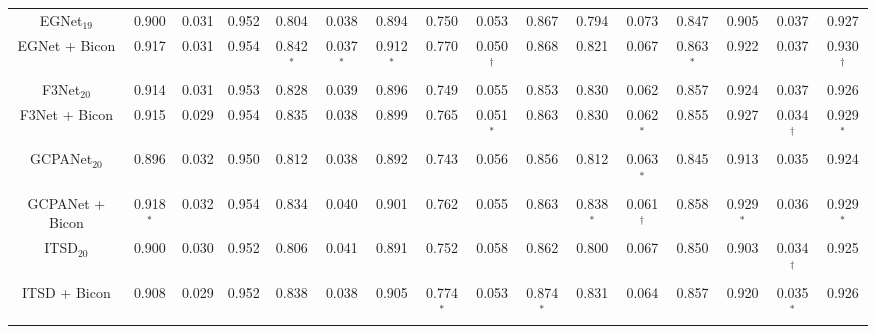 \documentclass[review]{cvpr}
\begin{document}
\begin{table*}[h!]
{{\begin{tabular}{c ccc ccc ccc ccc ccc}
\cline{1-16}
{EGNet$_{19}$ \cite{egnet}}&0.900&0.031&0.952&0.804&0.038&0.894&0.750&0.053&0.867&0.794&0.073&0.847&0.905&0.037&0.927\\
{EGNet + Bicon}&\color{BrickRed}0.917&0.031&\color{BrickRed}0.954&\color{BrickRed}0.842\color{blue}$^\ast$&\color{BrickRed}0.037\color{blue}$^\ast$&\color{BrickRed}0.912\color{blue}$^\ast$&\color{BrickRed}0.770&\color{BrickRed}0.050\color{blue}$^\dagger$&\color{BrickRed}0.868&\color{BrickRed}0.821&\color{BrickRed}0.067&\color{BrickRed}0.863\color{blue}$^\ast$\color{BrickRed}&\color{BrickRed}0.922&0.037&\color{BrickRed}0.930\color{blue}$^\dagger$\\

\cline{1-16}
{F3Net$_{20}$ \cite{f3net}}&0.914&0.031&0.953&0.828&0.039&0.896&0.749&0.055&0.853&0.830&0.062&\color{BrickRed}0.857&0.924&0.037&0.926\\


{F3Net + Bicon}&\color{BrickRed}0.915&\color{BrickRed}0.029&\color{BrickRed}0.954&\color{BrickRed}0.835&\color{BrickRed}0.038&\color{BrickRed}0.899&\color{BrickRed}0.765&\color{BrickRed}0.051\color{blue}$^\ast$&\color{BrickRed}0.863&0.830&0.062\color{blue}$^\ast$&0.855&\color{BrickRed}0.927&\color{BrickRed}0.034\color{blue}$^\dagger$&\color{BrickRed}0.929\color{blue}$^\ast$\\



\cline{1-16}
{GCPANet$_{20}$ \cite{gcpa}}&0.896&0.032&0.950&0.812&\color{BrickRed}0.038&0.892&0.743&0.056&0.856&0.812&0.063\color{blue}$^\ast$&0.845&0.913&\color{BrickRed}0.035&0.924\\


{GCPANet + Bicon}&\color{BrickRed}0.918\color{blue}$^\ast$&0.032&\color{BrickRed}0.954&\color{BrickRed}0.834&0.040&\color{BrickRed}0.901&\color{BrickRed}0.762&\color{BrickRed}0.055&\color{BrickRed}0.863&\color{BrickRed}0.838\color{blue}$^\ast$&\color{BrickRed}0.061\color{blue}$^\dagger$&\color{BrickRed}0.858&\color{BrickRed}0.929\color{blue}$^\ast$&0.036&\color{BrickRed}0.929\color{blue}$^\ast$\\


\cline{1-16}
{ITSD$_{20}$ \cite{ITSD}}&0.900&0.030&0.952&0.806&0.041&0.891&0.752&0.058&0.862&0.800&0.067&0.850&0.903&\color{BrickRed}0.034\color{blue}$^\dagger$&0.925\\


{ITSD + Bicon}&\color{BrickRed}0.908&\color{BrickRed}0.029&0.952&\color{BrickRed}0.838&\color{BrickRed}0.038&\color{BrickRed}0.905&\color{BrickRed}0.774\color{blue}$^\ast$&\color{BrickRed}0.053&\color{BrickRed}0.874\color{blue}$^\ast$&\color{BrickRed}0.831&\color{BrickRed}0.064&\color{BrickRed}0.857&\color{BrickRed}0.920&0.035\color{blue}$^\ast$&\color{BrickRed}0.926\\
\cline{1-16}



\end{tabular}}}
\end{table*}
\end{document}
